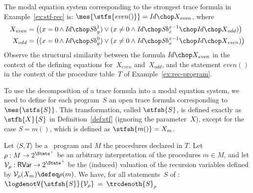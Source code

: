 \documentclass[a4paper,numberwithinsect]{lipics-v2021}
\begin{document}
\begin{example}%
  The modal equation system corresponding to the strongest trace
  formula in Example~\ref{ex:stf-rec} is: $\mes{\stfs{\mathit{even}()}} = \mathit{Id}\chop X_{\mathit{even}}$, where
  \begin{align*} 
    X_{\mathit{even}}  = \bigl((x = 0\, \land\, & \mathit{Id} \chop \mathit{Sb}^{1}_{y}) \lor (x \neq 0 \land \mathit{Id} \chop \mathit{Sb}^{x-1}_{x} \chop \mathit{Id} \chop X_{\mathit{odd}})\bigr)\\
    X_{\mathit{odd}}  = \bigl((x = 0\, \land\, & \mathit{Id} \chop \mathit{Sb}^{0}_{y}) \lor (x \neq 0 \land \mathit{Id} \chop \mathit{Sb}^{x-1}_{x} \chop \mathit{Id} \chop X_{\mathit{even}})\bigr)
  \end{align*}
  Observe the structural similarity between the formula
  $\mathit{Id}\chop X_{\mathit{even}}$ in the context of the defining
  equations for~$X_{\mathit{even}}$ and~$X_{\mathit{odd}}$, and the
  statement $\mathit{even}()$ in the context of the procedure
  table~$T$ of Example~\ref{ex:rec-program}.
\end{example}

To use the decomposition of a trace formula into a modal equation
system, we need to define for each program~$S$ an open trace formula
corresponding to $\mes{\stfs{S}}$.  This transformation, called $\stfsh{S}$,
is defined exactly as $\stfh{X}{S}$ in Definition~\ref{def:stf}
(ignoring the parameter~$X$), except for the case $S=m()$, which is
defined as $\stfsh{m()} = X_m$.

\begin{lemma}
\label{lem:stfsh-characterisation}
  Let $\langle S,T\rangle$ be a \Rec\ program and $M$ the procedures
  declared in $T$. Let $\rho : M \rightarrow 2^{\State^+}$ be an
  arbitrary interpretation of the procedures $m\in M$, and let
  $\mathcal{V}_\rho : \mathsf{RVar} \rightarrow 2^{\State^+}$ be the
  (induced) valuation of the recursion variables defined by
  $\mathcal{V}_\rho (X_m) \defeq \rho (m)$.
  We have, for all statements~$S$ of \Rec:
  $
  \logdenotV{\stfsh{S}}{\mathcal{V}_\rho}  \>=\>  \trcdenoth{S}_\rho
  $
\end{lemma}
\end{document}
